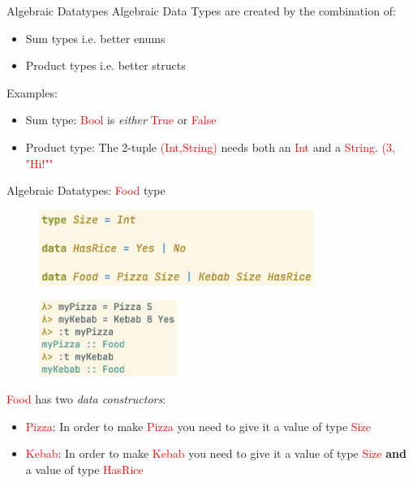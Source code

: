 \documentclass[pdf]{beamer}
\newcommand{\code}[1]{\textcolor{Red}{\textsf{#1}}}
\begin{document}
\begin{frame}{Algebraic Datatypes}
  Algebraic Data Types are created by the combination of:
  \begin{itemize}
  \item Sum types i.e. better enums
  \item Product types i.e. better structs
  \end{itemize}

  Examples:
  \begin{itemize}
  \item Sum type: \code{Bool} is \textit{either} \code{True} or \code{False}
  \item Product type: The 2-tuple \code{(Int,String)} needs both an \code{Int} and a \code{String}. \code{(3, "Hi!""}
  \end{itemize}
\end{frame}

\begin{frame}{Algebraic Datatypes: \code{Food} type}
  \begin{figure}[H]
    \centering
    \includegraphics[width=0.80\textwidth]{food-type}
  \end{figure}
  \begin{figure}[H]
    \centering
    \includegraphics[width=0.40\textwidth]{food-example}
  \end{figure}
  \code{Food} has two \emph{data constructors}:
  \begin{itemize}
  \item \code{Pizza}: In order to make \code{Pizza} you need to give it a value of type \code{Size}
  \item \code{Kebab}: In order to make \code{Kebab} you need to give it a value of type \code{Size} \textbf{and} a value of type \code{HasRice}
  \end{itemize}
\end{frame}
\end{document}
